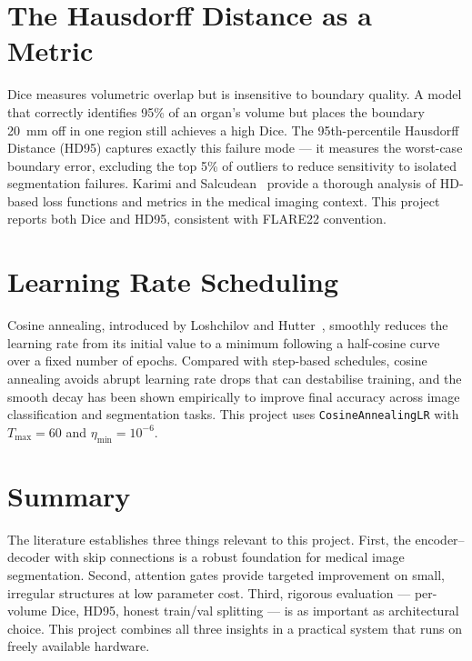 \section{The Hausdorff Distance as a Metric}

Dice measures volumetric overlap but is insensitive to boundary quality. A model that correctly
identifies 95\% of an organ's volume but places the boundary 20~mm off in one region still
achieves a high Dice. The 95th-percentile Hausdorff Distance (HD95) captures exactly this failure
mode --- it measures the worst-case boundary error, excluding the top 5\% of outliers to
reduce sensitivity to isolated segmentation failures. Karimi and Salcudean~\cite{karimi2020}
provide a thorough analysis of HD-based loss functions and metrics in the medical imaging context.
This project reports both Dice and HD95, consistent with FLARE22 convention.

\section{Learning Rate Scheduling}

Cosine annealing, introduced by Loshchilov and Hutter~\cite{loshchilov2017}, smoothly reduces
the learning rate from its initial value to a minimum following a half-cosine curve over a fixed
number of epochs. Compared with step-based schedules, cosine annealing avoids abrupt learning
rate drops that can destabilise training, and the smooth decay has been shown empirically to
improve final accuracy across image classification and segmentation tasks. This project uses
\texttt{CosineAnnealingLR} with $T_{\max} = 60$ and $\eta_{\min} = 10^{-6}$.

\section{Summary}

The literature establishes three things relevant to this project. First, the encoder--decoder
with skip connections is a robust foundation for medical image segmentation. Second, attention
gates provide targeted improvement on small, irregular structures at low parameter cost. Third,
rigorous evaluation --- per-volume Dice, HD95, honest train/val splitting --- is as important as
architectural choice. This project combines all three insights in a practical system that runs on
freely available hardware.
